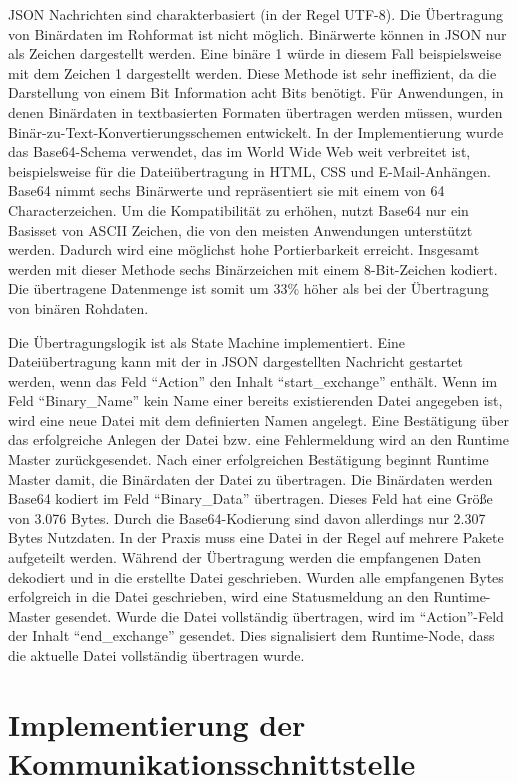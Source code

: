 \gls{JSON} Nachrichten sind charakterbasiert (in der Regel UTF-8). Die Übertragung von Binärdaten im Rohformat ist nicht möglich. Binärwerte können in \gls{JSON} nur als Zeichen dargestellt werden. Eine binäre 1 würde in diesem Fall beispielsweise mit dem Zeichen 1 dargestellt werden. Diese Methode ist sehr ineffizient, da die Darstellung von einem Bit Information acht Bits benötigt. Für Anwendungen, in denen Binärdaten in textbasierten Formaten übertragen werden müssen, wurden Binär-zu-Text-Konvertierungsschemen entwickelt. In der Implementierung wurde das Base64-Schema verwendet, das im World Wide Web weit verbreitet ist, beispielsweise für die Dateiübertragung in HTML, CSS und E-Mail-Anhängen. Base64 nimmt sechs Binärwerte und repräsentiert sie mit einem von 64 Characterzeichen. Um die Kompatibilität zu erhöhen, nutzt Base64 nur ein Basisset von \gls{ASCII} Zeichen, die von den meisten Anwendungen unterstützt werden. Dadurch wird eine möglichst hohe Portierbarkeit erreicht. Insgesamt werden mit dieser Methode sechs Binärzeichen mit einem 8-Bit-Zeichen kodiert. Die übertragene Datenmenge ist somit um 33\% höher als bei der Übertragung von binären Rohdaten. 

Die Übertragungslogik ist als State Machine implementiert. Eine Dateiübertragung kann mit der in JSON dargestellten Nachricht gestartet werden, wenn das Feld \enquote{Action} den Inhalt \enquote{start\_exchange} enthält. Wenn im Feld \enquote{Binary\_Name} kein Name einer bereits existierenden Datei angegeben ist, wird eine neue Datei mit dem definierten Namen angelegt. Eine Bestätigung über das erfolgreiche Anlegen der Datei bzw. eine Fehlermeldung wird an den Runtime Master zurückgesendet. Nach einer erfolgreichen Bestätigung beginnt Runtime Master damit, die Binärdaten der Datei zu übertragen. Die Binärdaten werden Base64 kodiert im Feld \enquote{Binary\_Data} übertragen. Dieses Feld hat eine Größe von 3.076 Bytes. Durch die Base64-Kodierung sind davon allerdings nur 2.307 Bytes Nutzdaten. In der Praxis muss eine Datei in der Regel auf mehrere Pakete aufgeteilt werden. Während der Übertragung werden die empfangenen Daten dekodiert und in die erstellte Datei geschrieben. Wurden alle empfangenen Bytes erfolgreich in die Datei geschrieben, wird eine Statusmeldung an den Runtime-Master gesendet. Wurde die Datei vollständig übertragen, wird im \enquote{Action}-Feld der Inhalt \enquote{end\_exchange} gesendet. Dies signalisiert dem Runtime-Node, dass die aktuelle Datei vollständig übertragen wurde. 

\section{Implementierung der Kommunikationsschnittstelle}

